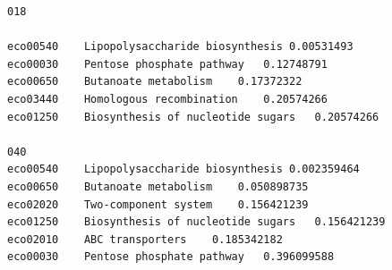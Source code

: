 \documentclass[
]{book}
\newenvironment{Shaded}{\begin{snugshade}}{\end{snugshade}}
\newcommand{\AttributeTok}[1]{\textcolor[rgb]{0.77,0.63,0.00}{#1}}
\newcommand{\FunctionTok}[1]{\textcolor[rgb]{0.00,0.00,0.00}{#1}}
\newcommand{\NormalTok}[1]{#1}
\newcommand{\OtherTok}[1]{\textcolor[rgb]{0.56,0.35,0.01}{#1}}
\newcommand{\SpecialCharTok}[1]{\textcolor[rgb]{0.00,0.00,0.00}{#1}}
\newcommand{\StringTok}[1]{\textcolor[rgb]{0.31,0.60,0.02}{#1}}
\begin{document}
\begin{verbatim}
018

eco00540    Lipopolysaccharide biosynthesis 0.00531493  
eco00030    Pentose phosphate pathway   0.12748791  
eco00650    Butanoate metabolism    0.17372322  
eco03440    Homologous recombination    0.20574266  
eco01250    Biosynthesis of nucleotide sugars   0.20574266

040
eco00540    Lipopolysaccharide biosynthesis 0.002359464
eco00650    Butanoate metabolism    0.050898735
eco02020    Two-component system    0.156421239
eco01250    Biosynthesis of nucleotide sugars   0.156421239
eco02010    ABC transporters    0.185342182
eco00030    Pentose phosphate pathway   0.396099588
\end{verbatim}

\begin{Shaded}
\end{Shaded}
\end{document}
